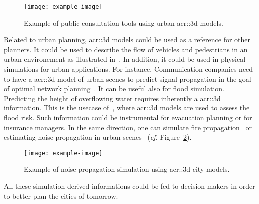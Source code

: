         \begin{figure}[h]
            \centering
            \texttt{[image: example-image]}             
            \caption{
                \label{fig::public_consultation} Example of public consultation tools using urban \gls{acr::3d} models.
            }
        \end{figure}
        Related to urban planning, \gls{acr::3d} models could be used as a reference for other planners.
        It could be used to describe the flow of vehicles and pedestrians in an urban environement as illustrated in~\textcite{Vanhoey:2017:VVS:3084363.3085085}.
        In addition, it could be used in physical simulations for urban applications.
        For instance, Communication companies need to have a \gls{acr::3d} model of urban scenes to predict signal propagation in the goal of optimal network planning~\parencite{yun2007radio}.
        It can be useful also for flood simulation.
        Predicting the height of overflowing water requires inherently a \gls{acr::3d} information.
        This is the usecase of~\textcite{varduhn2015multi}, where \gls{acr::3d} models are used to assess the flood risk.
        Such information could be instrumental for evacuation planning or for insurance managers.
        In the same direction, one can simulate fire propagation~\parencite{dimitropoulos2010fire} or estimating noise propagation in urban scenes~\parencite{stoter20083d} (\textit{cf.} Figure~\ref{fig::noise_propogation}).
        \begin{figure}[h]
            \centering
            \texttt{[image: example-image]}             
            \caption{
                \label{fig::noise_propogation} Example of noise propagation simulation using \gls{acr::3d} city models.
            }
        \end{figure}
        All these simulation derived informations could be fed to decision makers in order to better plan the cities of tomorrow.


